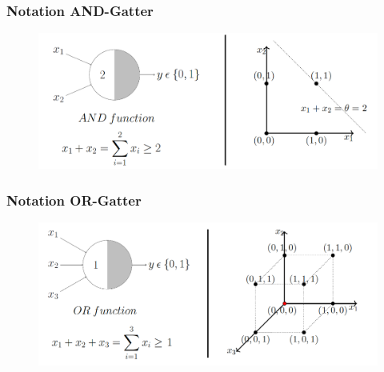 \begin{frame}
\frametitle{Notation AND-Gatter}

\begin{figure}
	\includegraphics[width=\linewidth]{./geschichtliches/mcCullochPittsNeuron/img/mpn_and_alpha}
\end{figure}


\end{frame}


\begin{frame}
\frametitle{Notation OR-Gatter}

\begin{figure}
	\includegraphics[width=\linewidth]{./geschichtliches/mcCullochPittsNeuron/img/mpn_or_alpha}
\end{figure}


\end{frame}


